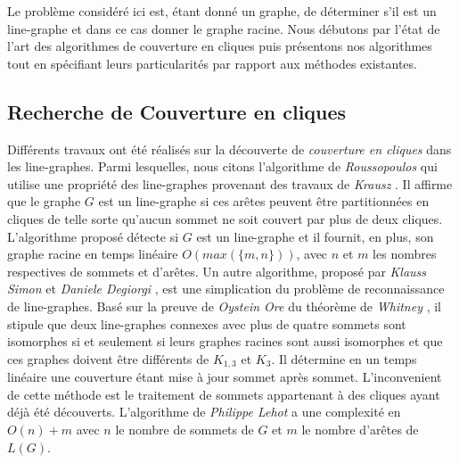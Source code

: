 

Le probl\`eme consid\'er\'e ici est, 
\'etant donn\'e un graphe, de d\'eterminer s'il est un line-graphe et dans ce cas donner le graphe racine.
Nous d\'ebutons par l'\'etat de l'art des algorithmes de couverture en cliques puis pr\'esentons nos algorithmes tout en sp\'ecifiant leurs particularit\'es par rapport aux m\'ethodes existantes. 

\subsection{Recherche de Couverture en cliques}
Diff\'erents travaux ont \'et\'e r\'ealis\'es sur la d\'ecouverte de {\em couverture en cliques} dans les line-graphes.
Parmi lesquelles, nous citons  l'algorithme de {\em Roussopoulos}  \cite{ROUSSOPOULOS1973108} qui utilise une propri\'et\'e des line-graphes provenant des travaux de {\em Krausz} \cite{krausz1943demonstration}. 
Il affirme que le graphe $G$ est un line-graphe si ces ar\^etes  peuvent \^etre partitionn\'ees en cliques  de telle sorte qu'aucun sommet ne soit couvert par plus de deux cliques. 
L'algorithme propos\'e d\'etecte si $G$ est un line-graphe et il fournit, en plus, son graphe racine en temps lin\'eaire $O(max(\{m,n\}))$, avec $n$ et $m$ les nombres respectives de sommets et d'ar\^etes.
\newline
Un autre algorithme, propos\'e par {\em Klauss Simon} et {\em Daniele Degiorgi} \cite{decompositionEnCliques}, est une simplication du probl\`eme de reconnaissance de line-graphes. Bas\'e sur la preuve de {\em Oystein Ore} \cite{ORE} du th\'eor\`eme de {\em Whitney} \cite{whitney1932congruent}, il stipule que deux line-graphes connexes avec plus de quatre sommets sont isomorphes si et seulement si leurs graphes racines sont aussi isomorphes et que ces graphes  doivent \^etre diff\'erents de $K_{1,3}$ et $K_3$. Il d\'etermine en un temps lin\'eaire une couverture \'etant mise \`a jour sommet apr\`es sommet. L'inconvenient de cette m\'ethode est le traitement de sommets appartenant \`a des cliques ayant d\'ej\`a \'et\'e d\'ecouverts.
\newline
L'algorithme de {\em Philippe Lehot} \cite{decompositionEnCliquesParArcs} a une complexit\'e en $O(n) + m$ avec $n$ le nombre de sommets de $G$ et $m$ le nombre d'ar\^etes de $L(G)$.
